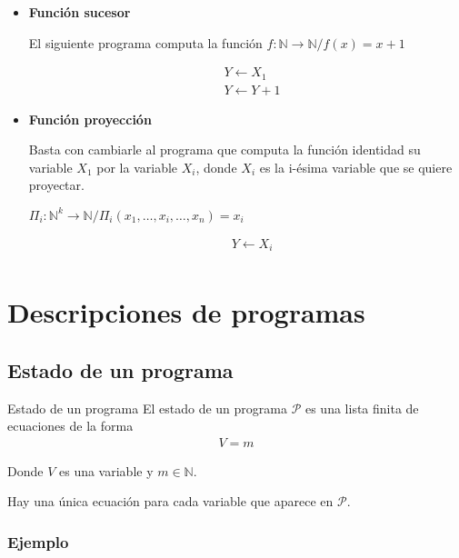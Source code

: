 \begin{itemize}
    \item \textbf{Función sucesor} \label{ej:funcion-sucesor}

        El siguiente programa computa la función
        $f: \mathbb{N} \to \mathbb{N} / f(x) = x + 1$

        \begin{align*}
            &Y \gets X_1 \\
            &Y \gets Y + 1
        \end{align*}

    \item \textbf{Función proyección} \label{ej:funcion-proyeccion}

        Basta con cambiarle al programa que computa la función identidad su 
        variable $X_1$ por la variable $X_i$, 
        donde $X_i$ es la i-ésima variable que se quiere proyectar.


        $\Pi_i: {\mathbb{N}}^k \to \mathbb{N} / 
        \Pi_i (x_1, \dotsc, x_i, \dotsc, x_n) = x_i$

        \begin{align*}
            &Y \gets X_i \\
        \end{align*}
\end{itemize}

\section{Descripciones de programas}

\subsection{Estado de un programa}

\begin{definicion}{Estado de un programa}{}
    El estado de un programa $\mathcal{P}$ es una lista finita de ecuaciones 
    de la forma
    \begin{gather*}
        V = m
    \end{gather*}

    Donde $V$ es una variable y $m \in \mathbb{N}$.

    \medskip

    Hay una única ecuación para cada variable que aparece en $\mathcal{P}$.
\end{definicion}

\subsubsection{Ejemplo}

